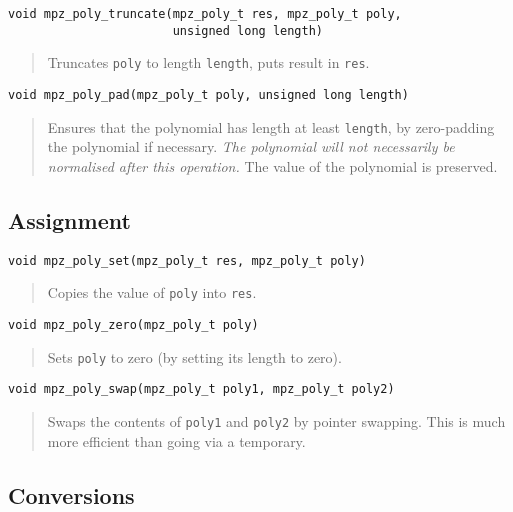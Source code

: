 \documentclass[a4paper,10pt]{article}
\newcommand{\code}{\lstinline}
\begin{document}
\begin{lstlisting}
void mpz_poly_truncate(mpz_poly_t res, mpz_poly_t poly,
                       unsigned long length)
\end{lstlisting}
\begin{quote}
Truncates \code{poly} to length \code{length}, puts result in \code{res}.
\end{quote}


\begin{lstlisting}
void mpz_poly_pad(mpz_poly_t poly, unsigned long length)
\end{lstlisting}
\begin{quote}
Ensures that the polynomial has length at least \code{length}, by zero-padding the polynomial if necessary. \emph{The polynomial will not necessarily be normalised after this operation.} The value of the polynomial is preserved.
\end{quote}



\subsection{Assignment}

\begin{lstlisting}
void mpz_poly_set(mpz_poly_t res, mpz_poly_t poly)
\end{lstlisting}
\begin{quote}
Copies the value of \code{poly} into \code{res}.
\end{quote}

\begin{lstlisting}
void mpz_poly_zero(mpz_poly_t poly)
\end{lstlisting}
\begin{quote}
Sets \code{poly} to zero (by setting its length to zero).
\end{quote}

\begin{lstlisting}
void mpz_poly_swap(mpz_poly_t poly1, mpz_poly_t poly2)
\end{lstlisting}
\begin{quote}
Swaps the contents of \code{poly1} and \code{poly2} by pointer swapping. This is much more efficient than going via a temporary.
\end{quote}


\subsection{Conversions}
\end{document}
